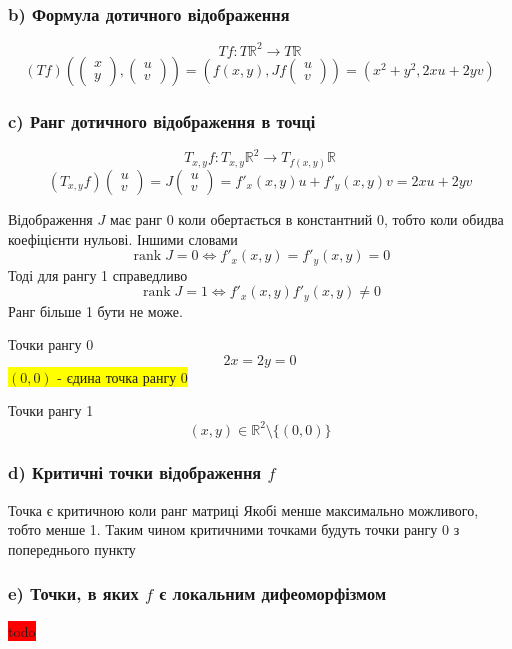 \documentclass[10pt, a4paper]{article} %
\newcommand{\R}{\mathbb{R}}
\newcommand{\J}{J}
\DeclareMathOperator{\rank}{rank}
\newcommand{\todo}[1]{\colorbox{red}{#1}}
\begin{document}
\subsubsection*{b) Формула дотичного відображення}
\[Tf : T\R^2 \to T\R\]
\[(Tf)\left(\begin{pmatrix} x \\ y \end{pmatrix}, \begin{pmatrix} u \\ v \end{pmatrix}\right) 
= \left(f(x,y),\J f \begin{pmatrix} u \\ v \end{pmatrix}\right) 
= \left(x^2+y^2, 2xu+2yv\right)\]

\subsubsection*{c) Ранг дотичного відображення в точці}
\[T_{x,y} f : T_{x,y}\R^2 \to T_{f(x,y)}\R\]
\[(T_{x,y} f) \begin{pmatrix} u \\ v \end{pmatrix}
= J\begin{pmatrix} u \\ v \end{pmatrix} = f'_x(x,y) u + f'_y(x,y) v = 2xu+2yv\]

Відображення $J$ має ранг 0 коли обертається в константний 0, тобто коли обидва коефіцієнти нульові.
Іншими словами
\[\rank J = 0 \iff f'_x(x,y)=f'_y(x,y)=0\]
Тоді для рангу 1 справедливо
\[\rank J = 1 \iff f'_x(x,y)f'_y(x,y) \ne 0\]
Ранг більше 1 бути не може.

Точки рангу 0
\[2x=2y=0\]
\colorbox{yellow}{$(0,0)$ - єдина точка рангу 0}

Точки рангу 1
\[(x,y) \in \R^2 \setminus \{(0,0)\}\]

\subsubsection*{d) Критичні точки відображення $f$}

Точка є критичною коли ранг матриці Якобі менше максимально можливого, тобто менше 1. 
Таким чином критичними точками будуть точки рангу 0 з попереднього пункту

\subsubsection*{e) Точки, в яких $f$ є локальним дифеоморфізмом}
\todo{todo}
\end{document}
